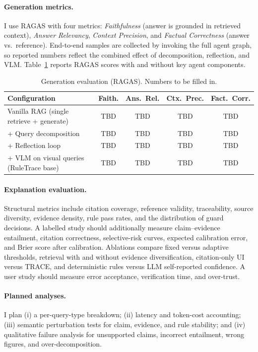 \documentclass[11pt]{article}
\begin{document}
\paragraph{Generation metrics.} I use RAGAS with four metrics: \emph{Faithfulness} (answer is grounded in retrieved context), \emph{Answer Relevancy}, \emph{Context Precision}, and \emph{Factual Correctness} (answer vs.\ reference). End-to-end samples are collected by invoking the full agent graph, so reported numbers reflect the combined effect of decomposition, reflection, and VLM. Table~\ref{tab:generation} reports RAGAS scores with and without key agent components.

\begin{table}[h]
\centering
\small
\caption{Generation evaluation (RAGAS). Numbers to be filled in.}
\label{tab:generation}
\begin{tabular}{lcccc}
\toprule
Configuration & Faith. & Ans.\ Rel. & Ctx.\ Prec. & Fact.\ Corr. \\
\midrule
Vanilla RAG (single retrieve + generate)        & TBD & TBD & TBD & TBD \\
\;+ Query decomposition                         & TBD & TBD & TBD & TBD \\
\;\;+ Reflection loop                           & TBD & TBD & TBD & TBD \\
\;\;\;+ VLM on visual queries (RuleTrace base) & TBD & TBD & TBD & TBD \\
\bottomrule
\end{tabular}
\end{table}

\paragraph{Explanation evaluation.} Structural metrics include citation coverage, reference validity, traceability, source diversity, evidence density, rule pass rates, and the distribution of guard decisions. A labelled study should additionally measure claim--evidence entailment, citation correctness, selective-risk curves, expected calibration error, and Brier score after calibration. Ablations compare fixed versus adaptive thresholds, retrieval with and without evidence diversification, citation-only UI versus TRACE, and deterministic rules versus LLM self-reported confidence. A user study should measure error acceptance, verification time, and over-trust.

\paragraph{Planned analyses.} I plan (i) a per-query-type breakdown; (ii) latency and token-cost accounting; (iii) semantic perturbation tests for claim, evidence, and rule stability; and (iv) qualitative failure analysis for unsupported claims, incorrect entailment, wrong figures, and over-decomposition.
\end{document}
